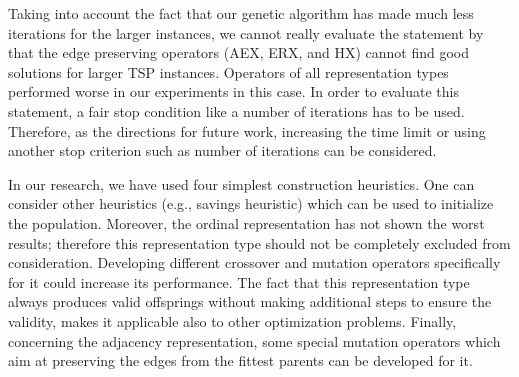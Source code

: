 Taking into account the fact that our genetic algorithm has made much less iterations for the larger instances, we cannot really evaluate the statement by \citeauthor{potvin1996genetic} \cite{potvin1996genetic} that the edge preserving operators (AEX, ERX, and HX) cannot find good solutions for larger TSP instances. Operators of all representation types performed worse in our experiments in this case. In order to evaluate this statement, a fair stop condition like a number of iterations has to be used. Therefore, as the directions for future work, increasing the time limit or using another stop criterion such as number of iterations can be considered. \par 

In our research, we have used four simplest construction heuristics. One can consider other heuristics (e.g., savings heuristic) which can be used to initialize the population. Moreover, the ordinal representation has not shown the worst results; therefore this representation type should not be completely excluded from consideration. Developing different crossover and mutation operators specifically for it could increase its performance. The fact that this representation type always produces valid offsprings without making additional steps to ensure the validity, makes it applicable also to other optimization problems. Finally, concerning the adjacency representation, some special mutation operators which aim at preserving the edges from the fittest parents can be developed for it.\par 




